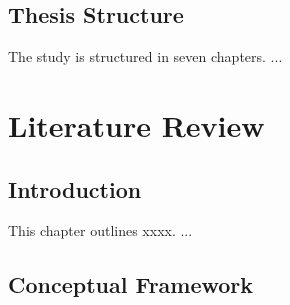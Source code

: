 \documentclass[11pt]{report}
\begin{document}
\section{Thesis Structure}

The study is structured in seven chapters. ...


\chapter{Literature Review}


\section{Introduction}

This chapter outlines xxxx. ...

\section{Conceptual Framework}
\end{document}
